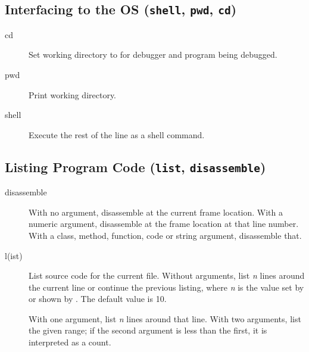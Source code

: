 \subsection{Interfacing to the OS ({\tt shell}, {\tt pwd},
  {\tt cd})\label{subsection-os}}

\begin{description}

\item[cd ]

Set working directory to  for debugger and program
being debugged.

\item[pwd]

Print working directory.  

\item[shell ]

Execute the rest of the line as a shell command.


\end{description}

\subsection{Listing Program Code ({\tt list}, {\tt disassemble})\label{subsection-listing}}

\begin{description}

\item[disassemble ]

With no argument, disassemble at the current frame location.  With a
numeric argument, disassemble at the frame location at that line
number. With a class, method, function, code or string argument,
disassemble that.

\item[l(ist) ]\label{command:list}

List source code for the current file.  Without arguments, list
\emph{n} lines around the current line or continue the previous
listing, where \emph{n} is the value set by  or
shown by .  The default value is 10.

With one argument, list \emph{n} lines around that line.  With
two arguments, list the given range; if the second argument is less
than the first, it is interpreted as a count.

\end{description}

